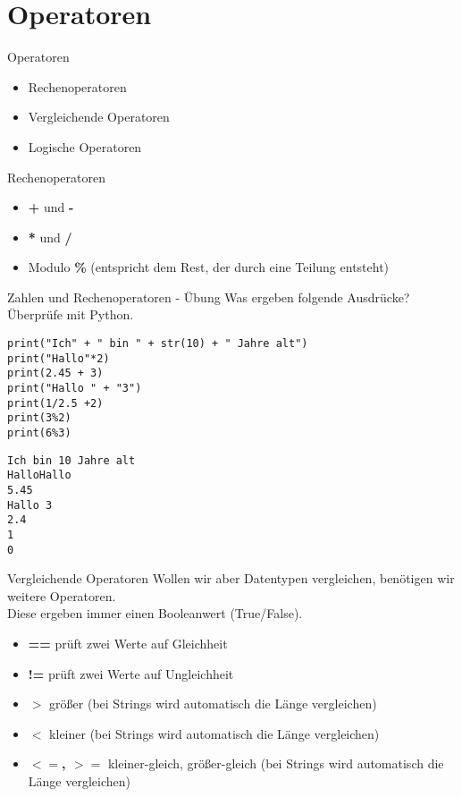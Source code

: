 \section{Operatoren}

\begin{frame}[fragile]{Operatoren}
\begin{itemize}
	\item Rechenoperatoren 
	\item Vergleichende Operatoren
	\item Logische Operatoren
\end{itemize}
\end{frame}

\begin{frame}[fragile]{Rechenoperatoren}
\begin{itemize}
\item \textbf{+} und \textbf{-}
\item \textbf{*} und \textbf{/}
\item Modulo \textbf{\%} (entspricht dem Rest, der durch eine Teilung entsteht)
\end{itemize}
\end{frame}


\begin{frame}[fragile]{Zahlen und Rechenoperatoren - Übung}
Was ergeben folgende Ausdrücke? Überprüfe mit  Python.
\begin{lstlisting}
print("Ich" + " bin " + str(10) + " Jahre alt") 
print("Hallo"*2)
print(2.45 + 3)
print("Hallo " + "3")
print(1/2.5 +2)
print(3%2)
print(6%3)
\end{lstlisting}
\pause{}
\begin{lstlisting}
Ich bin 10 Jahre alt
HalloHallo
5.45 
Hallo 3
2.4
1
0
\end{lstlisting}
\end{frame}



\begin{frame}[fragile]{Vergleichende Operatoren}
Wollen wir aber Datentypen vergleichen, benötigen wir weitere Operatoren.\\
Diese ergeben immer einen Booleanwert (True/False).\\

\begin{itemize}
\item \textbf{==} prüft zwei Werte auf Gleichheit
\item \textbf{!=} prüft zwei Werte auf Ungleichheit
\item \textbf{$>$} größer (bei Strings wird automatisch die Länge vergleichen)
\item \textbf{$<$} kleiner (bei Strings wird automatisch die Länge vergleichen)
\item \textbf{$<=$, $>=$}  kleiner-gleich, größer-gleich (bei Strings wird automatisch die Länge vergleichen)

\end{itemize}
\end{frame}

